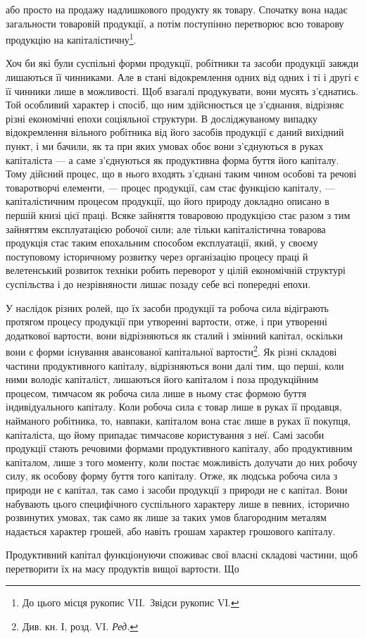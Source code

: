 \parcont{}  %
або просто на продажу надлишкового продукту як товару. Спочатку
вона надає загальности товаровій продукції, а потім поступінно перетворює
всю товарову продукцію на капіталістичну\footnote{
До цього місця рукопис VII.~Звідси рукопис VІ.
}.

Хоч би які були суспільні форми продукції, робітники та засоби продукції
завжди лишаються її чинниками. Але в стані відокремлення одних
від одних і ті і другі є її чинники лише в можливості. Щоб взагалі
продукувати, вони мусять з’єднатись. Той особливий характер і спосіб,
що ним здійснюється це з’єднання, відрізняє різні економічні епохи соціяльної
структури. В досліджуваному випадку відокремлення вільного
робітника від його засобів продукції є даний вихідний пункт, і ми
бачили, як та при яких умовах обоє вони з’єднуються в руках капіталіста —
а саме з’єднуються як продуктивна форма буття його капіталу. Тому
дійсний процес, що в нього входять з’єднані таким чином особові та
речові товаротворчі елементи, — процес продукції, сам стає функцією капіталу,
— капіталістичним процесом продукції, що його природу докладно
описано в першій книзі цієї праці. Всяке зайняття товаровою продукцією
стає разом з тим зайняттям експлуатацією робочої сили; але тільки капіталістична
товарова продукція стає таким епохальним способом експлуатації,
який, у своєму поступовому історичному розвитку через організацію
процесу праці й велетенський розвиток техніки робить переворот
у цілій економічній структурі суспільства і до незрівняности лишає позаду
себе всі попередні епохи.

У наслідок різних ролей, що їх засоби продукції та робоча сила відіграють
протягом процесу продукції при утворенні вартости, отже, і
при утворенні додаткової вартости, вони відрізняються як сталий і
змінний капітал, оскільки вони є форми існування авансованої капітальної
вартости\footnote*{
Див. кн. І, розд. VI. \emph{Ред.}
}. Як різні складові частини продуктивного капіталу, відрізняються
вони далі тим, що перші, коли ними володіє капіталіст, лишаються
його капіталом і поза продукційним процесом, тимчасом як робоча сила
лише в ньому стає формою буття індивідуального капіталу. Коли робоча
сила є товар лише в руках її продавця, найманого робітника, то, навпаки,
капіталом вона стає лише в руках її покупця, капіталіста, що
йому припадає тимчасове користування з неї. Самі засоби продукції
стають речовими формами продуктивного капіталу, або продуктивним
капіталом, лише з того моменту, коли постає можливість долучати до
них робочу силу, як особову форму буття того капіталу. Отже,
як людська робоча сила з природи не є капітал, так само і засоби
продукції з природи не є капітал. Вони набувають цього специфічного
суспільного характеру лише в певних, історично розвинутих умовах,
так само як лише за таких умов благородним металям надається характер
грошей, або навіть грошам характер грошового капіталу.

Продуктивний капітал функціонуючи споживає свої власні складові
частини, щоб перетворити їх на масу продуктів вищої вартости. Що
\parbreak{}  %

